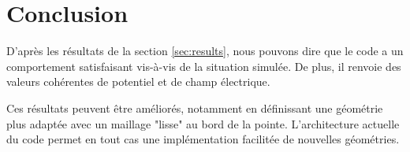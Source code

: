 \documentclass{article}
\begin{document}
\section{Conclusion}

D'après les résultats de la section \ref{sec:results}, nous pouvons
dire que le code a un comportement satisfaisant vis-à-vis de la
situation simulée. De plus, il renvoie des valeurs cohérentes de
potentiel et de champ électrique.

Ces résultats peuvent être améliorés, notamment en définissant
une géométrie plus adaptée avec un maillage "lisse" au bord
de la pointe. L'architecture actuelle du code permet en tout
cas une implémentation facilitée de nouvelles géométries.

\printbibliography[title={Références}]
\end{document}
